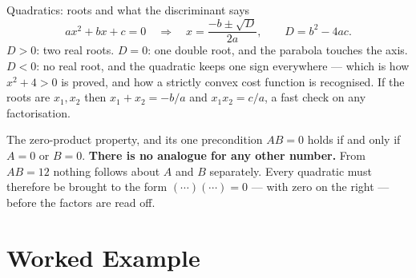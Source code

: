 \begin{rulebox}{Quadratics: roots and what the discriminant says}
\[
  ax^{2}+bx+c=0
  \quad\Longrightarrow\quad
  x=\frac{-b\pm\sqrt{D}}{2a},\qquad D=b^{2}-4ac .
\]
$D>0$: two real roots. $D=0$: one double root, and the parabola touches the
axis. $D<0$: no real root, and the quadratic keeps one sign everywhere ---
which is how $x^{2}+4>0$ is proved, and how a strictly convex cost function
is recognised. If the roots are $x_{1},x_{2}$ then
$x_{1}+x_{2}=-b/a$ and $x_{1}x_{2}=c/a$, a fast check on any factorisation.
\end{rulebox}

\begin{rulebox}{The zero-product property, and its one precondition}
$AB=0$ holds if and only if $A=0$ or $B=0$. \textbf{There is no analogue for
any other number.} From $A B=12$ nothing follows about $A$ and $B$
separately. Every quadratic must therefore be brought to the form
$(\cdots)(\cdots)=0$ --- with zero on the right --- before the factors are
read off.
\end{rulebox}

\section{Worked Example}

